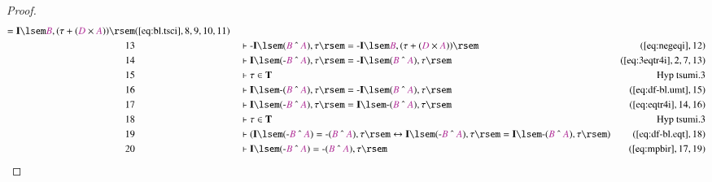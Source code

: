 \begin{proof}
\begin{align}
      = \mathbf{I} \lsem \mc{B} , ( \tau + ( \mc{D} \times
      \mc{A} ) )
      \rsem&(\mbox{\ref{eq:bl.tsci}},8,9,10,11)\notag
  \\ 13 &&  & \vdash \textrm{-} \mathbf{I} \lsem ( \mc{B} ~\string^~ \mc{A} ) ,
      \tau \rsem = \textrm{-} \mathbf{I} \lsem \mc{B} , (
      \tau + ( \mc{D} \times \mc{A} ) )
      \rsem&(\mbox{\ref{eq:negeqi}},12)\notag
  \\ 14 &&  & \vdash \mathbf{I} \lsem ( \textrm{-} \mc{B} ~\string^~ \mc{A} ) ,
      \tau \rsem = \textrm{-} \mathbf{I} \lsem ( \mc{B}
      ~\string^~ \mc{A} ) , \tau
      \rsem&(\mbox{\ref{eq:3eqtr4i}},2,7,13)\notag
  \\ 15 &&  & \vdash \tau \in \mathbf{T}&\text{Hyp~tsumi.3}\notag%
  \\ 16 &&  & \vdash \mathbf{I} \lsem \textrm{-} ( \mc{B} ~\string^~ \mc{A} ) ,
      \tau \rsem = \textrm{-} \mathbf{I} \lsem ( \mc{B}
      ~\string^~ \mc{A} ) , \tau
      \rsem&(\mbox{\ref{eq:df-bl.umt}},15)\notag
  \\ 17 &&  & \vdash \mathbf{I} \lsem ( \textrm{-} \mc{B} ~\string^~ \mc{A} ) ,
      \tau \rsem = \mathbf{I} \lsem \textrm{-} ( \mc{B}
      ~\string^~ \mc{A} ) , \tau
      \rsem&(\mbox{\ref{eq:eqtr4i}},14,16)\notag
  \\ 18 &&  & \vdash \tau \in \mathbf{T}&\text{Hyp~tsumi.3}\notag%
  \\ 19 &&  & \vdash ( \mathbf{I} \lsem ( \textrm{-} \mc{B} ~\string^~ \mc{A} )
      = \textrm{-} ( \mc{B} ~\string^~ \mc{A} ) , \tau
      \rsem \leftrightarrow \mathbf{I} \lsem ( \textrm{-}
      \mc{B} ~\string^~ \mc{A} ) , \tau \rsem = \mathbf{I}
      \lsem \textrm{-} ( \mc{B} ~\string^~ \mc{A} ) , \tau
      \rsem )&(\mbox{\ref{eq:df-bl.eqt}},18)\notag
  \\ 20 &&  & \vdash \mathbf{I} \lsem ( \textrm{-} \mc{B} ~\string^~ \mc{A} ) =
      \textrm{-} ( \mc{B} ~\string^~ \mc{A} ) , \tau
      \rsem&(\mbox{\ref{eq:mpbir}},17,19)\notag
\end{align}
\end{proof}

